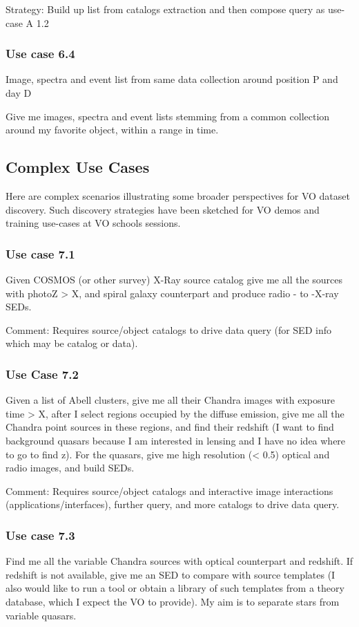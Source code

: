 \documentclass[11pt,a4paper]{ivoa}
\begin{document}
Strategy: Build up list from catalogs extraction and then compose query as use-case A 1.2

\subsubsection{Use case 6.4}
Image, spectra and event list from same data collection around position P and day D

Give me images, spectra and event lists stemming from a common collection around my favorite object, within a range in
time.

\subsection{Complex Use Cases}
Here are complex scenarios illustrating some broader perspectives for VO dataset discovery. Such discovery strategies
have been sketched for VO demos and training use-cases at VO schools sessions.

\subsubsection{Use case 7.1}
Given COSMOS (or other survey) X-Ray source catalog give me all the sources with photoZ {\textgreater} X, and spiral
galaxy counterpart and produce radio - to -X-ray SEDs.

Comment: Requires source/object catalogs to drive data query (for SED info which may be catalog or data).

\subsubsection{Use Case 7.2}
Given a list of Abell clusters, give me all their Chandra images with exposure time {\textgreater} X, after I select
regions occupied by the diffuse emission, give me all the Chandra point sources in these regions, and find their
redshift (I want to find background quasars because I am interested in lensing and I have no idea where to go to find
z). For the quasars, give me high resolution ({\textless} 0.5{\textquotedbl}) optical and radio images, and build SEDs.

Comment: Requires source/object catalogs and interactive image interactions (applications/interfaces), further query,
and more catalogs to drive data query.

\subsubsection{Use case 7.3}
Find me all the variable Chandra sources with optical counterpart and redshift. If redshift is not available, give me an
SED to compare with source templates (I also would like to run a tool or obtain a library of such templates from a
theory database, which I expect the VO to provide). My aim is to separate stars from variable quasars.
\end{document}
